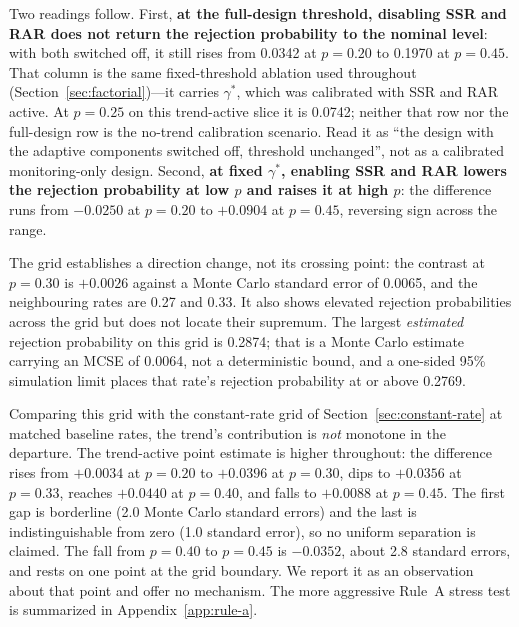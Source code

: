 \documentclass[11pt]{article}
\begin{document}
\smallskip
Two readings follow.  First, \textbf{at the full-design threshold, disabling
SSR and RAR does not return the rejection probability to the nominal level}:
with both switched off, it still rises from 0.0342 at $p = 0.20$ to 0.1970 at
$p = 0.45$.
That column is the same fixed-threshold ablation used throughout
(Section~\ref{sec:factorial})---it carries $\gamma^*$, which was calibrated
with SSR and RAR active.  At $p=0.25$ on this trend-active slice it is 0.0742;
neither that row nor the full-design row is the no-trend calibration scenario.
Read it as ``the design with the adaptive components switched off, threshold
unchanged'', not as a calibrated monitoring-only design.  Second,
\textbf{at fixed $\gamma^*$, enabling SSR and RAR lowers the rejection
probability at low $p$ and raises it at high $p$}: the difference runs from
$-0.0250$ at $p = 0.20$ to $+0.0904$ at $p = 0.45$, reversing sign across the
range.

The grid establishes a direction change, not its crossing point: the contrast
at $p=0.30$ is $+0.0026$ against a Monte Carlo standard error of 0.0065, and
the neighbouring rates are 0.27 and 0.33.  It also shows elevated rejection
probabilities across the grid but does not locate their supremum.  The largest
\emph{estimated}
rejection probability on this grid is 0.2874; that is a Monte Carlo estimate
carrying an MCSE of 0.0064, not a deterministic bound, and a one-sided 95\%
simulation limit places that rate's rejection probability at or above 0.2769.

Comparing this grid with the constant-rate grid of
Section~\ref{sec:constant-rate} at matched baseline rates, the trend's
contribution is \emph{not} monotone in the departure.  The trend-active point
estimate is higher throughout: the difference rises from $+0.0034$ at
$p=0.20$ to $+0.0396$ at $p=0.30$, dips to $+0.0356$ at $p=0.33$, reaches
$+0.0440$ at $p=0.40$, and falls to $+0.0088$ at $p=0.45$.  The first gap is
borderline (2.0 Monte Carlo standard errors) and the last is indistinguishable
from zero (1.0 standard error), so no uniform separation is claimed.  The fall
from $p=0.40$ to $p=0.45$ is $-0.0352$, about 2.8 standard errors, and rests on
one point at the grid boundary.  We report it as an observation about that point
and offer no mechanism.  The more aggressive Rule~A stress test is summarized in
Appendix~\ref{app:rule-a}.
\end{document}

